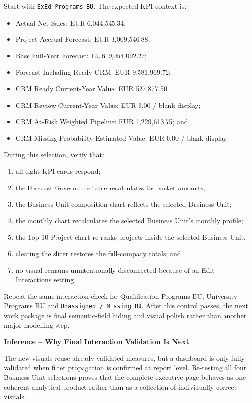 \documentclass[11pt,a4paper]{article}
\begin{document}
Start with \texttt{ExEd Programs BU}. The expected KPI context is:

\begin{itemize}[leftmargin=7mm,itemsep=2pt]
    \item Actual Net Sales: EUR 6,044,545.34;
    \item Project Accrual Forecast: EUR 3,009,546.88;
    \item Base Full-Year Forecast: EUR 9,054,092.22;
    \item Forecast Including Ready CRM: EUR 9,581,969.72;
    \item CRM Ready Current-Year Value: EUR 527,877.50;
    \item CRM Review Current-Year Value: EUR 0.00 / blank display;
    \item CRM At-Risk Weighted Pipeline: EUR 1,229,613.75; and
    \item CRM Missing Probability Estimated Value: EUR 0.00 / blank display.
\end{itemize}

During this selection, verify that:

\begin{enumerate}[leftmargin=9mm,itemsep=2pt]
    \item all eight KPI cards respond;
    \item the Forecast Governance table recalculates its bucket amounts;
    \item the Business Unit composition chart reflects the selected Business Unit;
    \item the monthly chart recalculates the selected Business Unit's monthly profile;
    \item the Top-10 Project chart re-ranks projects inside the selected Business Unit;
    \item clearing the slicer restores the full-company totals; and
    \item no visual remains unintentionally disconnected because of an Edit
    Interactions setting.
\end{enumerate}

Repeat the same interaction check for Qualification Programs BU, University Programs
BU and \texttt{Unassigned / Missing BU}. After this control passes, the next work
package is final semantic-field hiding and visual polish rather than another major
modelling step.

\begin{inferencebox}

\textbf{Inference -- Why Final Interaction Validation Is Next}

The new visuals reuse already validated measures, but a dashboard is only fully
validated when filter propagation is confirmed at report level. Re-testing all four
Business Unit selections proves that the complete executive page behaves as one
coherent analytical product rather than as a collection of individually correct
visuals.

\end{inferencebox}
\end{document}
